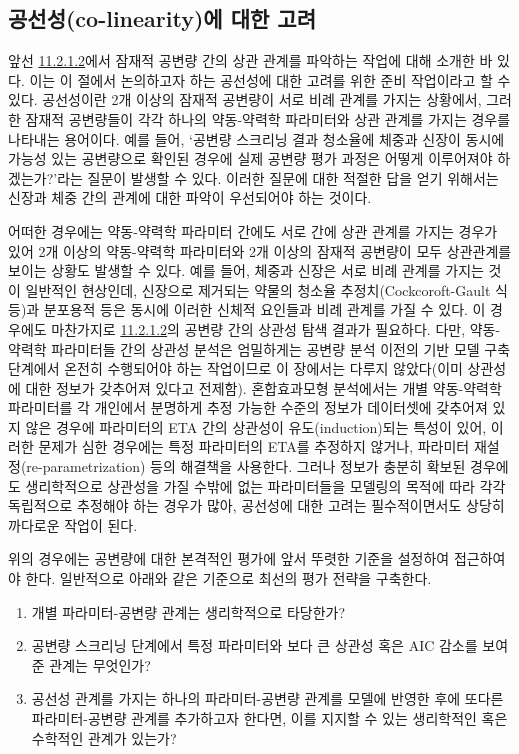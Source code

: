 \documentclass[
  11pt,
  krantz2,
  a4paper]{krantz}
\providecommand{\tightlist}{%
  \setlength{\itemsep}{0pt}\setlength{\parskip}{0pt}}
\theoremstyle{definition}
\theoremstyle{definition}
\theoremstyle{definition}
\theoremstyle{remark}
\begin{document}
\hypertarget{colinearity}{%
\subsection{공선성(co-linearity)에 대한 고려}\label{colinearity}}

앞선 \protect\hyperlink{potential-cov}{11.2.1.2}에서 잠재적 공변량 간의 상관 관계를 파악하는 작업에 대해 소개한 바 있다. 이는 이 절에서 논의하고자 하는 공선성에 대한 고려를 위한 준비 작업이라고 할 수 있다. 공선성이란 2개 이상의 잠재적 공변량이 서로 비례 관계를 가지는 상황에서, 그러한 잠재적 공변량들이 각각 하나의 약동-약력학 파라미터와 상관 관계를 가지는 경우를 나타내는 용어이다. 예를 들어, `공변량 스크리닝 결과 청소율에 체중과 신장이 동시에 가능성 있는 공변량으로 확인된 경우에 실제 공변량 평가 과정은 어떻게 이루어져야 하겠는가?'라는 질문이 발생할 수 있다. 이러한 질문에 대한 적절한 답을 얻기 위해서는 신장과 체중 간의 관계에 대한 파악이 우선되어야 하는 것이다.

어떠한 경우에는 약동-약력학 파라미터 간에도 서로 간에 상관 관계를 가지는 경우가 있어 2개 이상의 약동-약력학 파라미터와 2개 이상의 잠재적 공변량이 모두 상관관계를 보이는 상황도 발생할 수 있다. 예를 들어, 체중과 신장은 서로 비례 관계를 가지는 것이 일반적인 현상인데, 신장으로 제거되는 약물의 청소율 추정치(Cockcoroft-Gault 식 등)과 분포용적 등은 동시에 이러한 신체적 요인들과 비례 관계를 가질 수 있다. 이 경우에도 마찬가지로 \protect\hyperlink{potential-cov}{11.2.1.2}의 공변량 간의 상관성 탐색 결과가 필요하다. 다만, 약동-약력학 파라미터들 간의 상관성 분석은 엄밀하게는 공변량 분석 이전의 기반 모델 구축 단계에서 온전히 수행되어야 하는 작업이므로 이 장에서는 다루지 않았다(이미 상관성에 대한 정보가 갖추어져 있다고 전제함). 혼합효과모형 분석에서는 개별 약동-약력학 파라미터를 각 개인에서 분명하게 추정 가능한 수준의 정보가 데이터셋에 갖추어져 있지 않은 경우에 파라미터의 ETA 간의 상관성이 유도(induction)되는 특성이 있어, 이러한 문제가 심한 경우에는 특정 파라미터의 ETA를 추정하지 않거나, 파라미터 재설정(re-parametrization) 등의 해결책을 사용한다. 그러나 정보가 충분히 확보된 경우에도 생리학적으로 상관성을 가질 수밖에 없는 파라미터들을 모델링의 목적에 따라 각각 독립적으로 추정해야 하는 경우가 많아, 공선성에 대한 고려는 필수적이면서도 상당히 까다로운 작업이 된다.

위의 경우에는 공변량에 대한 본격적인 평가에 앞서 뚜렷한 기준을 설정하여 접근하여야 한다. 일반적으로 아래와 같은 기준으로 최선의 평가 전략을 구축한다.

\begin{enumerate}
\def\labelenumi{\arabic{enumi}.}
\tightlist
\item
  개별 파라미터-공변량 관계는 생리학적으로 타당한가?
\item
  공변량 스크리닝 단계에서 특정 파라미터와 보다 큰 상관성 혹은 AIC 감소를 보여준 관계는 무엇인가?
\item
  공선성 관계를 가지는 하나의 파라미터-공변량 관계를 모델에 반영한 후에 또다른 파라미터-공변량 관계를 추가하고자 한다면, 이를 지지할 수 있는 생리학적인 혹은 수학적인 관계가 있는가?
\end{enumerate}
\end{document}
